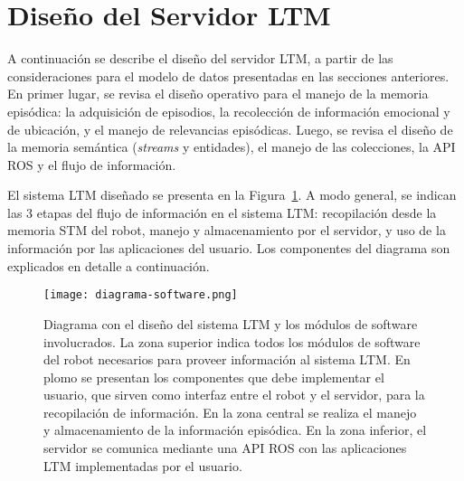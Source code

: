 

\section{Diseño del Servidor LTM}\label{sec:design-server}

A continuación se describe el diseño del servidor LTM, a partir de las consideraciones para el modelo de datos presentadas en las secciones anteriores. En primer lugar, se revisa el diseño operativo para el manejo de la memoria episódica: la adquisición de episodios, la recolección de información emocional y de ubicación, y el manejo de relevancias episódicas. Luego, se revisa el diseño de la memoria semántica (\textit{streams} y entidades), el manejo de las colecciones, la API ROS y el flujo de información.

El sistema LTM diseñado se presenta en la Figura~\ref{img:diagrama-software}. A modo general, se indican las 3 etapas del flujo de información en el sistema LTM: recopilación desde la memoria STM del robot, manejo y almacenamiento por el servidor, y uso de la información por las aplicaciones del usuario. Los componentes del diagrama son explicados en detalle a continuación.

\begin{figure}[!h]
	\centering
	\texttt{[image: diagrama-software.png]}
	\caption[Diseño del sistema LTM y módulos de software involucrados.]
	{\small Diagrama con el diseño del sistema LTM y los módulos de software involucrados. La zona superior indica todos los módulos de software del robot necesarios para proveer información al sistema LTM. En plomo se presentan los componentes que debe implementar el usuario, que sirven como interfaz entre el robot y el servidor, para la recopilación de información. En la zona central se realiza el manejo y almacenamiento de la información episódica. En la zona inferior, el servidor se comunica mediante una API ROS con las aplicaciones LTM implementadas por el usuario.}
	\label{img:diagrama-software}
\end{figure}


